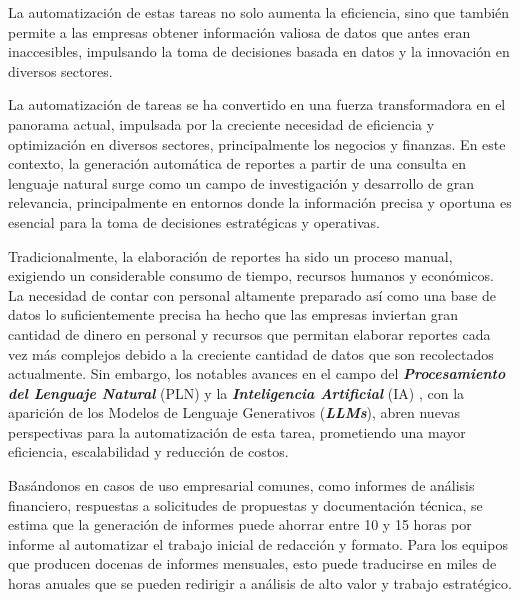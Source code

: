 La automatización de estas tareas no solo aumenta la eficiencia, sino que también permite a las empresas obtener información valiosa de datos que antes eran inaccesibles, impulsando la toma de decisiones basada en datos y la innovación en diversos sectores.

La automatización de tareas se ha convertido en una fuerza transformadora en el panorama actual, impulsada por la creciente necesidad de eficiencia y optimización en diversos sectores, principalmente los negocios y finanzas. En este contexto, la generación automática de reportes a partir de una consulta en lenguaje natural surge como un campo de investigación y desarrollo de gran relevancia, principalmente en entornos donde la información precisa y oportuna es esencial para la toma de decisiones estratégicas y operativas.

Tradicionalmente, la elaboración de reportes ha sido un proceso manual, exigiendo un considerable consumo de tiempo, recursos humanos y económicos. La necesidad de contar con personal altamente preparado así como una base de datos lo suficientemente precisa ha hecho que las empresas inviertan gran cantidad de dinero en personal y recursos que permitan elaborar reportes cada vez más complejos debido a la creciente cantidad de datos que son recolectados actualmente. Sin embargo, los notables avances en el campo del \textit{\textbf{Procesamiento del Lenguaje Natural}} (PLN) y la \textit{\textbf{Inteligencia Artificial}} (IA) \cite{russell2016artificial}, con la aparición de los Modelos de Lenguaje Generativos (\textit{\textbf{LLMs}}), abren nuevas perspectivas para la automatización de esta tarea, prometiendo una mayor eficiencia, escalabilidad y reducción de costos.

Basándonos en casos de uso empresarial comunes, como informes de análisis financiero, respuestas a solicitudes de propuestas y documentación técnica, se estima que la generación de informes puede ahorrar entre 10 y 15 horas por informe al automatizar el trabajo inicial de redacción y formato. Para los equipos que producen docenas de informes mensuales, esto puede traducirse en miles de horas anuales que se pueden redirigir a análisis de alto valor y trabajo estratégico.

